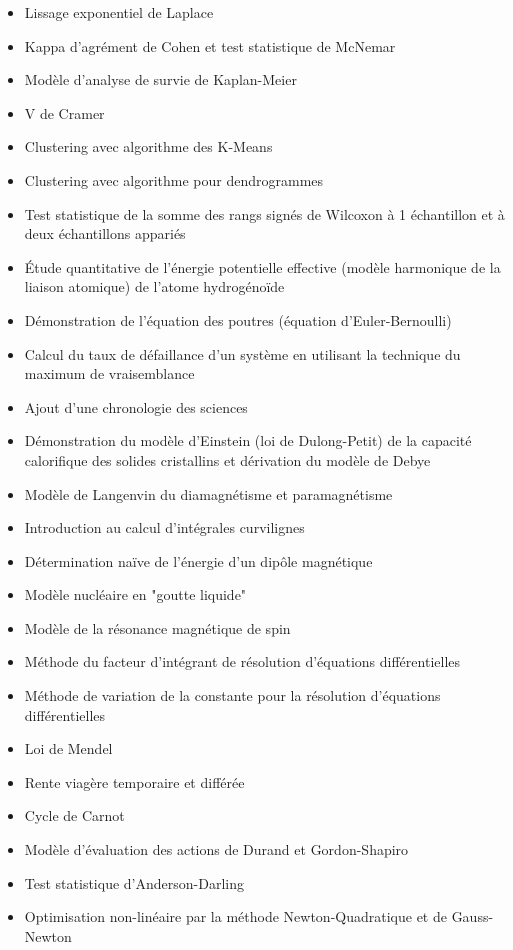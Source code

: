\documentclass[12pt,a4paper,twoside,openright]{report}
\theoremstyle{definition}
\theoremstyle{itexmp}
\numberwithin{equation}{section}
\begin{document}
\begin{itemize}
\begin{itemize}[noitemsep]
				\item Lissage exponentiel de Laplace
				\item Kappa d'agrément de Cohen et test statistique de McNemar
				\item Modèle d'analyse de survie de Kaplan-Meier
				\item V de Cramer
				\item Clustering avec algorithme des K-Means
				\item Clustering avec algorithme pour dendrogrammes
				\item Test statistique de la somme des rangs signés de Wilcoxon à 1 échantillon et à deux échantillons appariés
				\item Étude quantitative de l'énergie potentielle effective (modèle harmonique de la liaison atomique) de l'atome hydrogénoïde
				\item Démonstration de l'équation des poutres (équation d'Euler-Bernoulli)
				\item Calcul du taux de défaillance d'un système en utilisant la technique du maximum de vraisemblance
				\item Ajout d'une chronologie des sciences
				\item Démonstration du modèle d'Einstein (loi de Dulong-Petit) de la capacité calorifique des solides cristallins et dérivation du modèle de Debye
				\item Modèle de Langenvin du diamagnétisme et paramagnétisme
				\item Introduction au calcul d'intégrales curvilignes
				\item Détermination naïve de l'énergie d'un dipôle magnétique
				\item Modèle nucléaire en "goutte liquide"
				\item Modèle de la résonance magnétique de spin
				\item Méthode du facteur d'intégrant de résolution d'équations différentielles
				\item Méthode de variation de la constante pour la résolution d'équations différentielles
				\item Loi de Mendel
				\item Rente viagère temporaire et différée
				\item Cycle de Carnot
				\item Modèle d'évaluation des actions de Durand et Gordon-Shapiro
				\item Test statistique d'Anderson-Darling
				\item Optimisation non-linéaire par la méthode Newton-Quadratique et de Gauss-Newton

\end{itemize}
\end{itemize}
\end{document}
